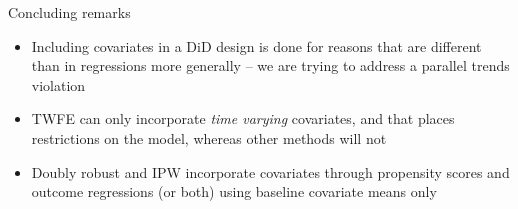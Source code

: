 \documentclass{beamer}
\begin{document}
\begin{frame}{Concluding remarks}

\begin{itemize}
\item Including covariates in a DiD design is done for reasons that are different than in regressions more generally -- we are trying to address a parallel trends violation
\item TWFE can only incorporate \emph{time varying} covariates, and that places restrictions on the model, whereas other methods will not
\item Doubly robust and IPW incorporate covariates through propensity scores and outcome regressions (or both) using baseline covariate means only
\end{itemize}

\end{frame}
\end{document}
